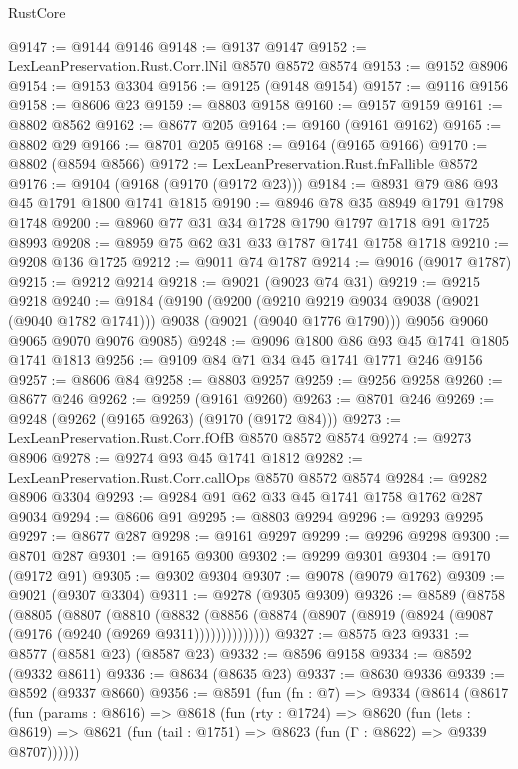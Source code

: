 \begin{lexlean}{RustCore}
\begin{coremodule}
@9147 := @9144 @9146
@9148 := @9137 @9147
@9152 := LexLeanPreservation.Rust.Corr.lNil @8570 @8572 @8574
@9153 := @9152 @8906
@9154 := @9153 @3304
@9156 := @9125 (@9148 @9154)
@9157 := @9116 @9156
@9158 := @8606 @23
@9159 := @8803 @9158
@9160 := @9157 @9159
@9161 := @8802 @8562
@9162 := @8677 @205
@9164 := @9160 (@9161 @9162)
@9165 := @8802 @29
@9166 := @8701 @205
@9168 := @9164 (@9165 @9166)
@9170 := @8802 (@8594 @8566)
@9172 := LexLeanPreservation.Rust.fnFallible @8572
@9176 := @9104 (@9168 (@9170 (@9172 @23)))
@9184 := @8931 @79 @86 @93 @45 @1791 @1800 @1741 @1815
@9190 := @8946 @78 @35 @8949 @1791 @1798 @1748
@9200 := @8960 @77 @31 @34 @1728 @1790 @1797 @1718 @91 @1725 @8993
@9208 := @8959 @75 @62 @31 @33 @1787 @1741 @1758 @1718
@9210 := @9208 @136 @1725
@9212 := @9011 @74 @1787
@9214 := @9016 (@9017 @1787)
@9215 := @9212 @9214
@9218 := @9021 (@9023 @74 @31)
@9219 := @9215 @9218
@9240 := @9184
    (@9190
      (@9200
        (@9210 @9219 @9034 @9038 (@9021 (@9040 @1782 @1741)))
        @9038
        (@9021 (@9040 @1776 @1790)))
      @9056
      @9060
      @9065
      @9070
      @9076
      @9085)
@9248 := @9096 @1800 @86 @93 @45 @1741 @1805 @1741 @1813
@9256 := @9109 @84 @71 @34 @45 @1741 @1771 @246 @9156
@9257 := @8606 @84
@9258 := @8803 @9257
@9259 := @9256 @9258
@9260 := @8677 @246
@9262 := @9259 (@9161 @9260)
@9263 := @8701 @246
@9269 := @9248 (@9262 (@9165 @9263) (@9170 (@9172 @84)))
@9273 := LexLeanPreservation.Rust.Corr.fOfB @8570 @8572 @8574
@9274 := @9273 @8906
@9278 := @9274 @93 @45 @1741 @1812
@9282 := LexLeanPreservation.Rust.Corr.callOps @8570 @8572 @8574
@9284 := @9282 @8906 @3304
@9293 := @9284 @91 @62 @33 @45 @1741 @1758 @1762 @287 @9034
@9294 := @8606 @91
@9295 := @8803 @9294
@9296 := @9293 @9295
@9297 := @8677 @287
@9298 := @9161 @9297
@9299 := @9296 @9298
@9300 := @8701 @287
@9301 := @9165 @9300
@9302 := @9299 @9301
@9304 := @9170 (@9172 @91)
@9305 := @9302 @9304
@9307 := @9078 (@9079 @1762)
@9309 := @9021 (@9307 @3304)
@9311 := @9278 (@9305 @9309)
@9326 := @8589
    (@8758
      (@8805
        (@8807
          (@8810
            (@8832
              (@8856 (@8874 (@8907 (@8919 (@8924 (@9087 (@9176 (@9240 (@9269 @9311))))))))))))))
@9327 := @8575 @23
@9331 := @8577 (@8581 @23) (@8587 @23)
@9332 := @8596 @9158
@9334 := @8592 (@9332 @8611)
@9336 := @8634 (@8635 @23)
@9337 := @8630 @9336
@9339 := @8592 (@9337 @8660)
@9356 := @8591
    (fun (fn : @7) =>
    @9334
      (@8614
        (@8617
          (fun (params : @8616) =>
          @8618
            (fun (rty : @1724) =>
            @8620
              (fun (lets : @8619) =>
              @8621 (fun (tail : @1751) => @8623 (fun (Γ : @8622) => @9339 @8707))))))

\end{coremodule}
\end{lexlean}
